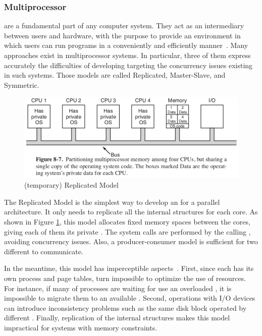 		\subsubsection{Multiprocessor \oses}
		\label{sec::multiprocessor_os}

			\oses are a fundamental part of any computer system.
			They act as an intermediary between users and hardware, with the
			purpose to provide an environment in which users can run programs
			in a conveniently and efficiently manner~\cite{Abraham: book}.
			Many \os approaches exist in multiprocessor systems.
			In particular, three of them express accurately the difficulties
			of developing \oses targeting the concurrency issues existing in
			such systems.
			Those models are called Replicated, Master-Slave, and Symmetric.

			\begin{figure}[h]
				\centering
				\includegraphics[width=.8\textwidth]{images/replicated-os.png}

				\caption{
					(temporary) Replicated \os Model
				}\par
				\label{fig::replicated_os}
			\end{figure}

			The Replicated Model is the simplest way to develop an \os for a
			parallel architecture.
			It only needs to replicate all the internal \os structures for each core.
			As shown in Figure \ref{fig::replicated_os}, this model allocates fixed memory spaces
			between the cores, giving each of them its private \os.
			The system calls are performed by the calling \cpu, avoiding concurrency issues.
			Also, a producer-consumer model is sufficient for two different \cpus to communicate.

			In the meantime, this model has imperceptible aspects~\cite{tanenbaum:4ed}.
			First, since each \cpu has its own process and page tables, turn impossible
			to optimize the use of resources.
			For instance, if many of processes are waiting for use an overloaded \cpu,
			it is impossible to migrate them to an available \cpu.
			Second, operations with I/O devices can introduce inconsistency problems
			such as the same disk block operated by different \cpus.
			Finally, replication of the internal \os structures makes this model
			impractical for systems with memory constraints.

